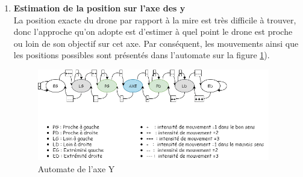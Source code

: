 \documentclass[12pt]{article}
\begin{document}
    \begin{enumerate}
        \item \textbf{Estimation de la position sur l’axe des y} \\
           La position exacte du drone par rapport à la mire est très difficile à trouver, donc l’approche qu’on adopte est d’estimer à quel point le drone est proche ou loin de son objectif sur cet axe. Par conséquent, les mouvements ainsi que les positions possibles sont présentés dans l’automate sur la figure \ref{fig:image4}).\\
            \begin{figure}[H]
            \centering
            \includegraphics[height=4cm]{image4.png}
            \caption{Automate de l'axe Y}
            \label{fig:image4}
            \end{figure}
        

\end{enumerate}
\end{document}
